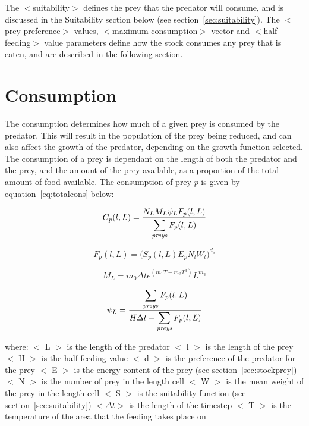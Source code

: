 \documentclass[10pt,twoside]{book}
\begin{document}
The $<$suitability$>$ defines the prey that the predator will consume, and is discussed in the Suitability section below (see section~\ref{sec:suitability}).  The $<$prey preference$>$ values, $<$maximum consumption$>$ vector and $<$half feeding$>$ value parameters define how the stock consumes any prey that is eaten, and are described in the following section.

\section{Consumption}\label{sec:consumption}
The consumption determines how much of a given prey is consumed by the predator.  This will result in the population of the prey being reduced, and can also affect the growth of the predator, depending on the growth function selected.  The consumption of a prey is dependant on the length of both the predator and the prey, and the amount of the prey available, as a proportion of the total amount of food available.  The consumption of prey $p$ is given by equation~\ref{eq:totalcons} below:

\begin{equation}\label{eq:totalcons}
C_{p}(l, L) = \frac{N_{L} M_{L} \psi_{L} F_{p}(l, L)}{\displaystyle \sum_{\it preys} F_{p}(l, L)}
\end{equation}

\begin{equation}\label{eq:preycons}
F_{p}(l, L) =\Big( S_{p}(l, L) E_{p} N_{l} W_{l} \Big) ^{d_{p}}
\end{equation}

\begin{equation}\label{eq:maxcons}
M_{L} = m_{0} \Delta t e^{(m_{1}T - m_{2}T^3)} L^{m_{3}}
\end{equation}

\begin{equation}\label{eq:feedlevel}
\psi_{L} = \frac{\displaystyle \sum_{\it preys} F_{p}(l, L)}{H \Delta t + \displaystyle \sum_{\it preys} F_{p}(l, L)}
\end{equation}

where:\newline
$<$ L $>$ is the length of the predator\newline
$<$ l $>$ is the length of the prey\newline
$<$ H $>$ is the half feeding value\newline
$<$ d $>$ is the preference of the predator for the prey\newline
$<$ E $>$ is the energy content of the prey (see section~\ref{sec:stockprey})\newline
$<$ N $>$ is the number of prey in the length cell\newline
$<$ W $>$ is the mean weight of the prey in the length cell\newline
$<$ S $>$ is the suitability function (see section~\ref{sec:suitability})\newline
$<\Delta t>$ is the length of the timestep\newline
$<$ T $>$ is the temperature of the area that the feeding takes place on
\end{document}
